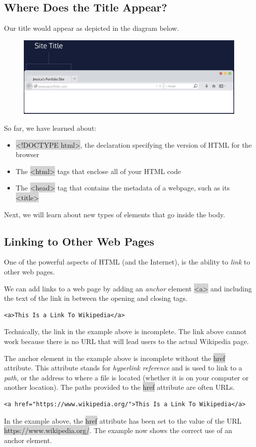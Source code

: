 \documentclass[11pt]{article}
\begin{document}
\subsection{Where Does the Title Appear?}
Our title would appear as depicted in the diagram below.
\begin{figure}[H]
\includegraphics[scale = 0.4]{1_2}
\centering
\end{figure}
So far, we have learned about:
\begin{itemize}[leftmargin = *]
\item \colorbox{lightgray}{<!DOCTYPE html>}, the declaration specifying the version of HTML for the browser
\item The \colorbox{lightgray}{<html>} tags that enclose all of your HTML code
\item The \colorbox{lightgray}{<head>} tag that contains the metadata of a webpage, such as its \colorbox{lightgray}{<title>}
\end{itemize}
Next, we will learn about new types of elements that go inside the body.

\subsection{Linking to Other Web Pages}
One of the powerful aspects of HTML (and the Internet), is the ability to \textit{link} to other web pages.

We can add links to a web page by adding an \textit{anchor} element \colorbox{lightgray}{<a>} and including the text of the link in between the opening and closing tags.
\begin{lstlisting}
<a>This Is a Link To Wikipedia</a>
\end{lstlisting}
Technically, the link in the example above is incomplete. The link above cannot work because there is no URL that will lead users to the actual Wikipedia page. 

The anchor element in the example above is incomplete without the \colorbox{lightgray}{href} attribute. This attribute stands for \textit{hyperlink reference} and is used to link to a \textit{path}, or the address to where a file is located (whether it is on your computer or another location). The paths provided to the \colorbox{lightgray}{href} attribute are often URLs.
\begin{lstlisting}
<a href="https://www.wikipedia.org/">This Is a Link To Wikipedia</a>
\end{lstlisting}
In the example above, the \colorbox{lightgray}{href} attribute has been set to the value of the URL \colorbox{lightgray}{https://www.wikipedia.org/}. The example now shows the correct use of an anchor element.
\end{document}

